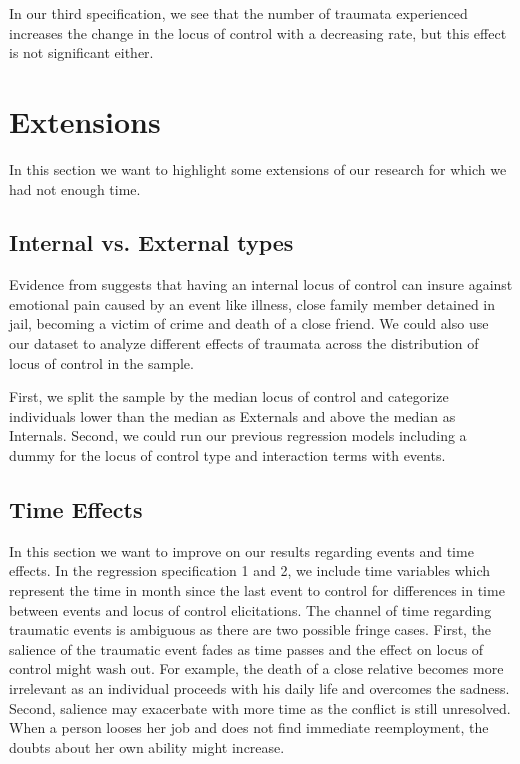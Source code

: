 \documentclass[12pt, a4paper, fleqn, parskip]{scrartcl}
\begin{document}
In our third specification, we see that the number of traumata experienced increases the
change in the locus of control with a decreasing rate, but this effect is not
significant either.


\section{Extensions} %
\label{sec:extensions}

In this section we want to highlight some extensions of our research for which we had
not enough time.

\subsection{Internal vs. External types} %
\label{sub:internal_vs_external_types}

Evidence from \citet{buddelmeyer2016} suggests that having an internal locus of control
can insure against emotional pain caused by an event like illness, close family member
detained in jail, becoming a victim of crime and death of a close friend. We could also
use our dataset to analyze different effects of traumata across the distribution of
locus of control in the sample.

First, we split the sample by the median locus of control and categorize individuals
lower than the median as Externals and above the median as Internals. Second, we could
run our previous regression models including a dummy for the locus of control type and
interaction terms with events.


\subsection{Time Effects} %
\label{sub:time_effects}

In this section we want to improve on our results regarding events and time effects. In
the regression specification 1 and 2, we include time variables which represent the time
in month since the last event to control for differences in time between events and
locus of control elicitations. The channel of time regarding traumatic events is
ambiguous as there are two possible fringe cases. First, the salience of the traumatic
event fades as time passes and the effect on locus of control might wash out. For
example, the death of a close relative becomes more irrelevant as an individual proceeds
with his daily life and overcomes the sadness. Second, salience may exacerbate with more
time as the conflict is still unresolved. When a person looses her job and does not find
immediate reemployment, the doubts about her own ability might increase.
\end{document}

